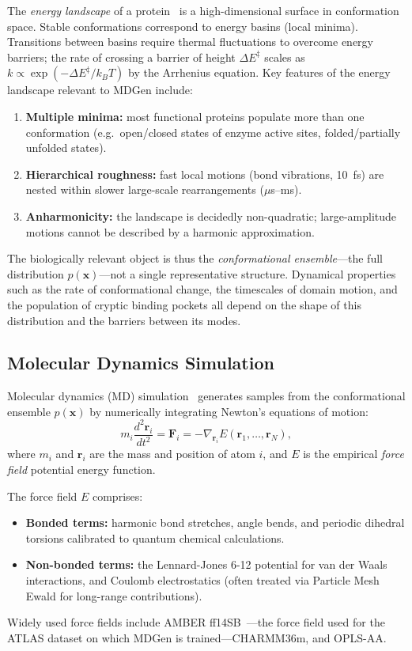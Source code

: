 \documentclass[11pt,a4paper]{article}
\newcommand{\bx}{\mathbf{x}}
\newcommand{\br}{\mathbf{r}}
\begin{document}
The \emph{energy landscape} of a protein~\cite{frauenfelder1991} is a high-dimensional surface
in conformation space.  Stable conformations correspond to energy basins (local minima).
Transitions between basins require thermal fluctuations to overcome energy barriers; the rate of
crossing a barrier of height $\Delta E^\ddagger$ scales as $k \propto \exp(-\Delta E^\ddagger /
k_BT)$ by the Arrhenius equation.  Key features of the energy landscape relevant to MDGen include:
\begin{enumerate}[leftmargin=2em]
  \item \textbf{Multiple minima:} most functional proteins populate more than one conformation
    (e.g.\ open/closed states of enzyme active sites, folded/partially unfolded states).
  \item \textbf{Hierarchical roughness:} fast local motions (bond vibrations, 10~fs) are nested
    within slower large-scale rearrangements ($\mu$s--ms).
  \item \textbf{Anharmonicity:} the landscape is decidedly non-quadratic; large-amplitude motions
    cannot be described by a harmonic approximation.
\end{enumerate}

The biologically relevant object is thus the \emph{conformational ensemble}---the full distribution
$p(\bx)$---not a single representative structure.  Dynamical properties such as the rate of
conformational change, the timescales of domain motion, and the population of cryptic binding
pockets all depend on the shape of this distribution and the barriers between its modes.

\subsection{Molecular Dynamics Simulation}

Molecular dynamics (MD) simulation~\cite{adcock2006} generates samples from the conformational
ensemble $p(\bx)$ by numerically integrating Newton's equations of motion:
\begin{equation}
  m_i \frac{d^2 \br_i}{dt^2} = \bm{F}_i = -\nabla_{\br_i} E(\br_1, \ldots, \br_N),
  \label{eq:newton}
\end{equation}
where $m_i$ and $\br_i$ are the mass and position of atom $i$, and $E$ is the empirical
\emph{force field} potential energy function.

The force field $E$ comprises:
\begin{itemize}[leftmargin=2em]
  \item \textbf{Bonded terms:} harmonic bond stretches, angle bends, and periodic dihedral torsions
    calibrated to quantum chemical calculations.
  \item \textbf{Non-bonded terms:} the Lennard-Jones 6-12 potential for van der Waals interactions,
    and Coulomb electrostatics (often treated via Particle Mesh Ewald for long-range contributions).
\end{itemize}
Widely used force fields include AMBER ff14SB~\cite{maier2015}---the force field used for the ATLAS
dataset on which MDGen is trained---CHARMM36m, and OPLS-AA.
\end{document}
